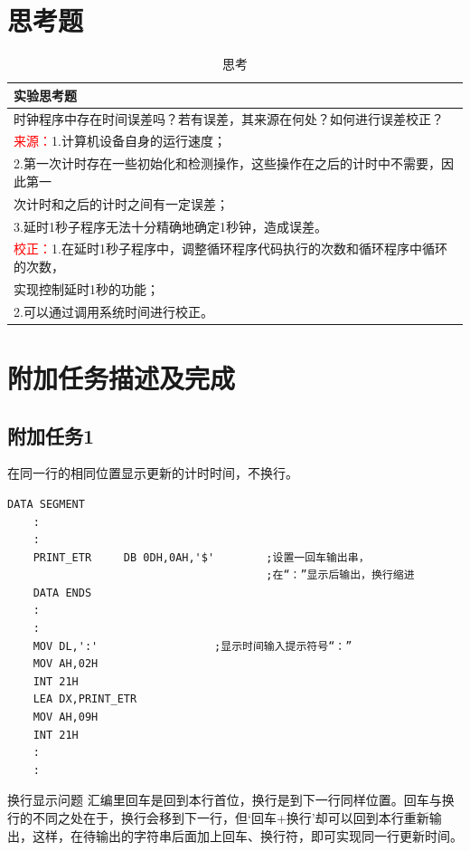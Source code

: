 \documentclass[11pt]{SEU-Digital-Report}
\newcommand{\grayrow}{\rowcolor[rgb]{ .906, .902, .902}}
\begin{document}
\section{思考题}
\begin{table}[htbp]
    \centering
    \caption{思考 \label{tab:parameters}}
    \bgroup{}
    \setlength{\tabcolsep}{4.5mm}
        \begin{tabular}{l}
          \toprule
          \textbf{实验思考题} \\
          \midrule\midrule
          \grayrow 时钟程序中存在时间误差吗？若有误差，其来源在何处？如何进行误差校正？\\
          \textcolor{red}{来源：}1.计算机设备自身的运行速度；\\
          2.第一次计时存在一些初始化和检测操作，这些操作在之后的计时中不需要，因此第一\\次计时和之后的计时之间有一定误差；\\
          3.延时1秒子程序无法十分精确地确定1秒钟，造成误差。\\
          \textcolor{red}{校正：}1.在延时1秒子程序中，调整循环程序代码执行的次数和循环程序中循环的次数，
          \\实现控制延时1秒的功能；\\
          2.可以通过调用系统时间进行校正。\\
          \bottomrule
        \end{tabular}
    \egroup
\end{table}


\section{附加任务描述及完成}
\subsection{附加任务1}
在同一行的相同位置显示更新的计时时间，不换行。
\begin{lstlisting}[language={[x86masm]Assembler},title=delay]
    DATA SEGMENT
    :
    :
    PRINT_ETR     DB 0DH,0AH,'$'        ;设置一回车输出串，
                                        ;在“：”显示后输出，换行缩进
    DATA ENDS
    :
    :
    MOV DL,':'                  ;显示时间输入提示符号“：”
    MOV AH,02H
    INT 21H
    LEA DX,PRINT_ETR            
    MOV AH,09H
    INT 21H
    :
    :
\end{lstlisting}

\begin{analyze}{换行显示问题}{}
    汇编里回车是回到本行首位，换行是到下一行同样位置。回车与换行的不同之处在于，换行会移到下一行，但‘回车+换行’却可以回到本行重新输出，这样，在待输出的字符串后面加上回车、换行符，即可实现同一行更新时间。
\end{analyze}
\end{document}
